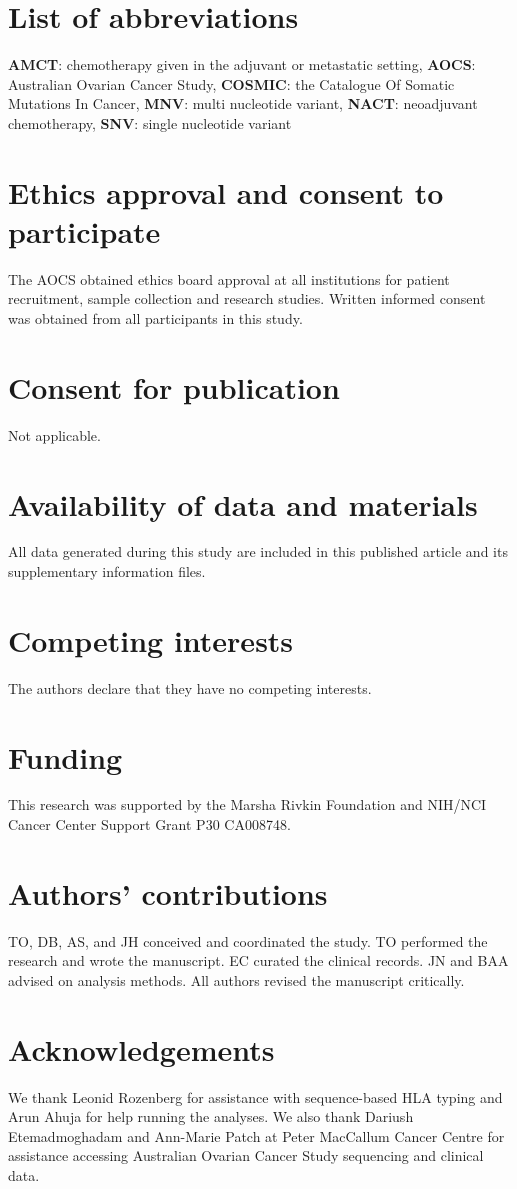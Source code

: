 \section{List of abbreviations}
\textbf{AMCT}: chemotherapy given in the adjuvant or metastatic setting, \textbf{AOCS}: Australian Ovarian Cancer Study, \textbf{COSMIC}: the Catalogue Of Somatic Mutations In Cancer, \textbf{MNV}: multi nucleotide variant, \textbf{NACT}: neoadjuvant chemotherapy, \textbf{SNV}: single nucleotide variant

\section{Ethics approval and consent to participate}
The AOCS obtained ethics board approval at all institutions for patient recruitment, sample collection and research studies. Written informed consent was obtained from all participants in this study.

\section{Consent for publication}
Not applicable.

\section{Availability of data and materials}
All data generated during this study are included in this published article and its supplementary information files.

\section{Competing interests}
The authors declare that they have no competing interests.

\section{Funding}
This research was supported by the Marsha Rivkin Foundation and NIH/NCI Cancer Center Support Grant P30 CA008748.

\section{Authors' contributions}
TO, DB, AS, and JH conceived and coordinated the study. TO performed the research and wrote the manuscript. EC curated the clinical records. JN and BAA advised on analysis methods.  All authors revised the manuscript critically.

\section{Acknowledgements}
We thank Leonid Rozenberg for assistance with sequence-based HLA typing and Arun Ahuja for help running the analyses. We also thank Dariush Etemadmoghadam and Ann-Marie Patch at Peter MacCallum Cancer Centre for assistance accessing Australian Ovarian Cancer Study sequencing and clinical data.
